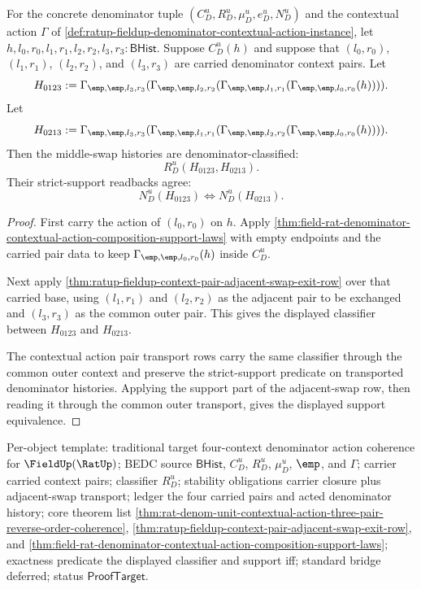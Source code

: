 \begin{theorem}
\label{thm:ratup-fieldup-four-context-pair-adjacent-swap-closure}
For the concrete denominator tuple
$(C_D^u,R_D^u,\mu_D^u,e_D^u,N_D^u)$ and the contextual action $\Gamma$ of
\autoref{def:ratup-fieldup-denominator-contextual-action-instance}, let
$h,l_0,r_0,l_1,r_1,l_2,r_2,l_3,r_3:\mathsf{BHist}$. Suppose $C_D^u(h)$ and
suppose that $(l_0,r_0)$, $(l_1,r_1)$, $(l_2,r_2)$, and $(l_3,r_3)$ are
carried denominator context pairs. Let
$$
H_{0123}:=
\Gamma_{\emp,\emp,l_3,r_3}
(\Gamma_{\emp,\emp,l_2,r_2}
(\Gamma_{\emp,\emp,l_1,r_1}
(\Gamma_{\emp,\emp,l_0,r_0}(h)))).
$$
Let
$$
H_{0213}:=
\Gamma_{\emp,\emp,l_3,r_3}
(\Gamma_{\emp,\emp,l_1,r_1}
(\Gamma_{\emp,\emp,l_2,r_2}
(\Gamma_{\emp,\emp,l_0,r_0}(h)))).
$$
Then the middle-swap histories are denominator-classified:
$$
R_D^u(H_{0123},H_{0213}).
$$
Their strict-support readbacks agree:
$$
N_D^u(H_{0123})
\Longleftrightarrow
N_D^u(H_{0213}).
$$
\end{theorem}
\begin{proof}
First carry the action of $(l_0,r_0)$ on $h$. Apply
\autoref{thm:field-rat-denominator-contextual-action-composition-support-laws}
with empty endpoints and the carried pair data to keep
$\Gamma_{\emp,\emp,l_0,r_0}(h)$ inside $C_D^u$.

Next apply
\autoref{thm:ratup-fieldup-context-pair-adjacent-swap-exit-row} over that
carried base, using $(l_1,r_1)$ and $(l_2,r_2)$ as the adjacent pair to be
exchanged and $(l_3,r_3)$ as the common outer pair. This gives the displayed
classifier between $H_{0123}$ and $H_{0213}$.

The contextual action pair transport rows carry the same classifier through the
common outer context and preserve the strict-support predicate on transported
denominator histories. Applying the support part of the adjacent-swap row, then
reading it through the common outer transport, gives the displayed support
equivalence.
\end{proof}

Per-object template: traditional target four-context denominator action
coherence for $\FieldUp(\RatUp)$; BEDC source $\mathsf{BHist}$, $C_D^u$,
$R_D^u$, $\mu_D^u$, $\emp$, and $\Gamma$; carrier carried context pairs;
classifier $R_D^u$; stability obligations carrier closure plus adjacent-swap
transport; ledger the four carried pairs and acted denominator history; core
theorem list
\autoref{thm:rat-denom-unit-contextual-action-three-pair-reverse-order-coherence},
\autoref{thm:ratup-fieldup-context-pair-adjacent-swap-exit-row}, and
\autoref{thm:field-rat-denominator-contextual-action-composition-support-laws};
exactness predicate the displayed classifier and support iff; standard bridge
deferred; status $\mathsf{ProofTarget}$.

